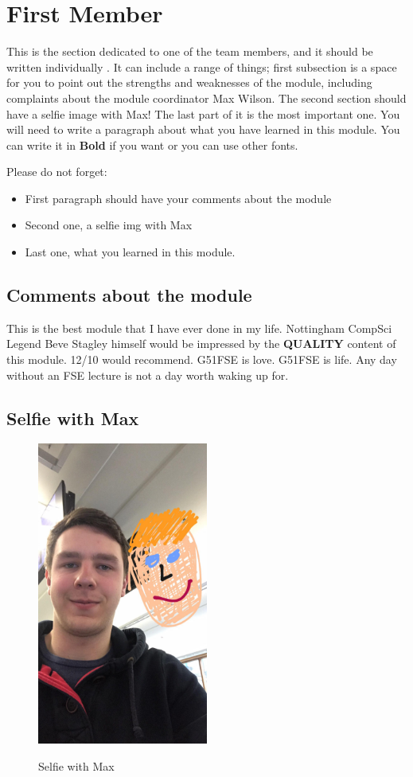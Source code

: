 \section{First Member}
This is the section dedicated to one of the team members, and it should be written individually . It can include a range of things; first subsection is a space for you to point out the strengths and weaknesses of the module, including complaints about the module coordinator Max Wilson. The second section should have a selfie image with Max! The last part of it is the most important one. You will need to write a paragraph about what you have learned in this module. You can write it in \textbf{Bold} if you want or you can use other fonts. 

Please do not forget:
\begin{itemize}
	\item First paragraph should have your comments about the module
	\item Second one, a selfie img with Max
	\item Last one, what you learned in this module.
\end{itemize}

\subsection{Comments about the module}
This is the best module that I have ever done in my life. Nottingham CompSci Legend Beve Stagley himself would be impressed by the \textbf{QUALITY} content of this module. 12/10 would recommend. G51FSE is love. G51FSE is life. Any day without an FSE lecture is not a day worth waking up for.

\subsection{Selfie with Max}

\begin{figure}[h]
\caption{Selfie with Max}
\centering
\includegraphics[width=0.5\textwidth]{selfieGeorge.jpg}
\label{fig:selfie}
\end{figure}

